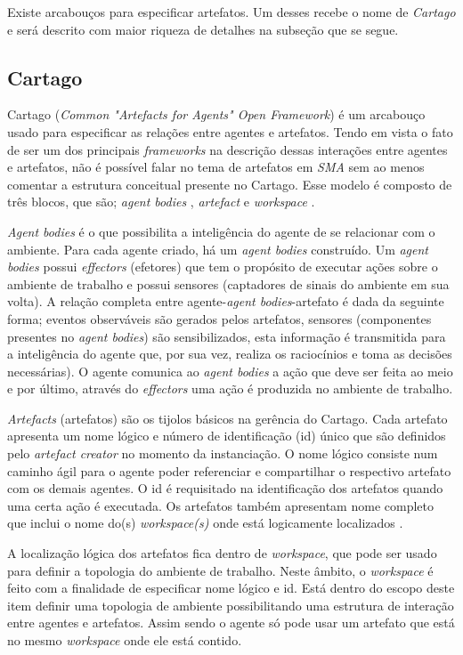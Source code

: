 Existe arcabouços para especificar artefatos. Um desses recebe o nome de \textit{Cartago} e será descrito com maior riqueza de detalhes na subseção que se segue.
 
 \subsection{Cartago}

Cartago (\textit{Common "Artefacts for Agents" Open Framework}) é um arcabouço usado para especificar as relações entre agentes e artefatos. Tendo em vista o fato de ser um dos principais \textit{frameworks} na descrição dessas interações entre agentes e artefatos, não é possível falar no tema de artefatos em \textit{SMA} sem ao menos comentar a estrutura conceitual presente no Cartago. Esse modelo é composto de três blocos, que são; \textit{agent bodies} , \textit{artefact} e \textit{workspace} \cite{cartago}.

 \textit{Agent bodies} é  o que possibilita a inteligência do agente de se relacionar com o ambiente. Para cada agente criado, há um \textit{agent bodies} construído. Um \textit{agent bodies} possui \textit{effectors} (efetores) que tem o propósito de executar ações sobre o ambiente de trabalho e possui sensores (captadores de sinais do ambiente em sua volta). A relação completa entre agente-\textit{agent bodies}-artefato é dada da seguinte forma; eventos observáveis são gerados pelos artefatos, sensores (componentes presentes no \textit{agent bodies}) são sensibilizados, esta informação é transmitida para a inteligência do  agente que, por sua vez, realiza os raciocínios e toma as decisões necessárias). O agente comunica ao \textit{agent bodies} a ação que deve ser feita ao meio e por último, através do \textit{effectors} uma ação é produzida no ambiente de trabalho. 

 \textit{Artefacts} (artefatos) são os tijolos básicos na gerência do Cartago. Cada artefato apresenta um nome lógico e número de identificação (id) único que são definidos pelo \textit{artefact creator} no momento da instanciação. O nome lógico consiste num caminho ágil para o agente poder referenciar  e compartilhar o respectivo artefato com os demais agentes. O id é requisitado na identificação dos artefatos quando uma certa ação é executada. Os artefatos também apresentam nome completo que inclui o nome do(s) \textit{workspace(s)} onde está logicamente localizados \cite{cartago}.

 A localização lógica dos artefatos fica dentro de \textit{workspace}, que pode ser usado para definir a topologia do ambiente de trabalho. Neste âmbito, o \textit{workspace} é feito com a finalidade de especificar nome lógico e id. Está dentro do escopo deste item definir uma topologia de ambiente possibilitando uma estrutura de interação entre agentes e artefatos. Assim sendo o agente só pode usar um artefato que está no mesmo \textit{workspace} onde ele está contido. 